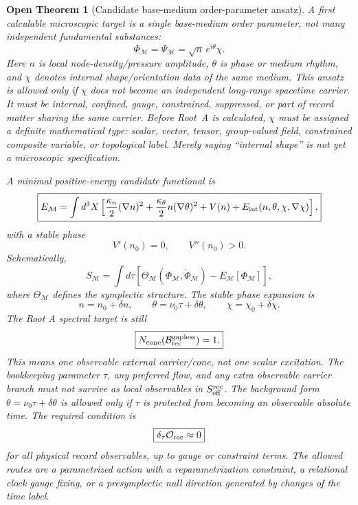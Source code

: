 \documentclass[11pt]{article}
\newtheorem{openthm}{Open Theorem}
\begin{document}
\begin{openthm}[Candidate base-medium order-parameter ansatz]
A first calculable microscopic target is a single base-medium order parameter,
not many independent fundamental substances:
\[
\boxed{
\Phi_{\mathcal M}
=
\Psi_{\mathcal M}
=
\sqrt n\,e^{i\theta}\chi.
}
\]
Here \(n\) is local node-density/pressure amplitude, \(\theta\) is phase or
medium rhythm, and \(\chi\) denotes internal shape/orientation data of the same
medium.  This ansatz is allowed only if \(\chi\) does not become an independent
long-range spacetime carrier.  It must be internal, confined, gauge,
constrained, suppressed, or part of record matter sharing the same carrier.
Before Root~A is calculated, \(\chi\) must be assigned a definite mathematical
type: scalar, vector, tensor, group-valued field, constrained composite
variable, or topological label.  Merely saying ``internal shape'' is not yet a
microscopic specification.

A minimal positive-energy candidate functional is
\[
\boxed{
E_{\mathcal M}
=
\int d^3X
\left[
\frac{\kappa_n}{2}(\nabla n)^2
+\frac{\kappa_\theta}{2}n(\nabla\theta)^2
+V(n)
+E_{\rm int}(n,\theta,\chi,\nabla\chi)
\right],
}
\]
with a stable phase
\[
\boxed{
V'(n_0)=0,
\qquad
V''(n_0)>0.
}
\]
Schematically,
\[
\boxed{
S_{\mathcal M}
=
\int d\tau
\left[
\Theta_{\mathcal M}(\Phi_{\mathcal M},\dot\Phi_{\mathcal M})
-E_{\mathcal M}[\Phi_{\mathcal M}]
\right],
}
\]
where \(\Theta_{\mathcal M}\) defines the symplectic structure.  The stable
phase expansion is
\[
\boxed{
n=n_0+\delta n,
\qquad
\theta=\nu_0\tau+\delta\theta,
\qquad
\chi=\chi_0+\delta\chi.
}
\]
The Root A spectral target is still
\[
\boxed{
N_{\rm cone}(\mathcal B_{\rm rec}^{\rm gapless})=1.
}
\]
This means one observable external carrier/cone, not one scalar excitation.
The bookkeeping parameter \(\tau\), any preferred flow, and any extra observable
carrier branch must not survive as local observables in
\(S_{\rm eff}^{\rm rec}\).
The background form \(\theta=\nu_0\tau+\delta\theta\) is allowed only if
\(\tau\) is protected from becoming an observable absolute time.  The required
condition is
\[
\boxed{
\delta_\tau{\cal O}_{\rm rec}\approx0
}
\]
for all physical record observables, up to gauge or constraint terms.  The
allowed routes are a parametrized action with a reparametrization constraint, a
relational clock gauge fixing, or a presymplectic null direction generated by
changes of the time label.


\end{openthm}
\end{document}
